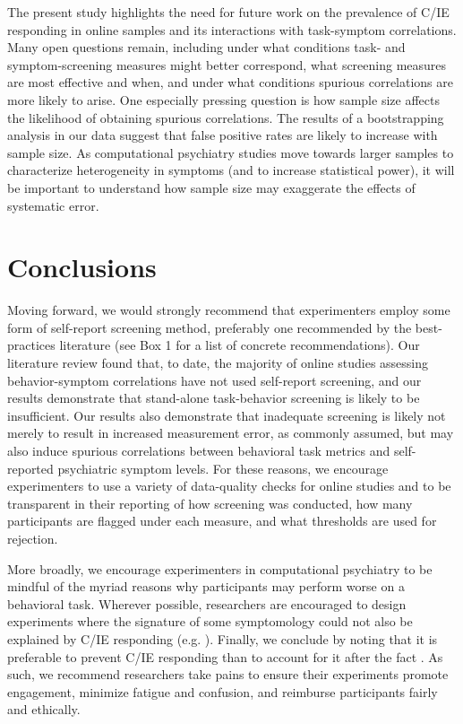 \documentclass[a4paper,notitlepage,12pt]{article}
\begin{document}
The present study highlights the need for future work on the prevalence of C/IE responding in online samples and its interactions with task-symptom correlations. Many open questions remain, including under what conditions task- and symptom-screening measures might better correspond, what screening measures are most effective and when, and under what conditions spurious correlations are more likely to arise. One especially pressing question is how sample size affects the likelihood of obtaining spurious correlations. The results of a bootstrapping analysis in our data suggest that false positive rates are likely to increase with sample size. As computational psychiatry studies move towards larger samples to characterize heterogeneity in symptoms (and to increase statistical power), it will be important to understand how sample size may exaggerate the effects of systematic error. 

\section{Conclusions}

Moving forward, we would strongly recommend that experimenters employ some form of self-report screening method, preferably one recommended by the best-practices literature (see Box 1 for a list of concrete recommendations). Our literature review found that, to date, the majority of online studies assessing behavior-symptom correlations have not used self-report screening, and our results demonstrate that stand-alone task-behavior screening is likely to be insufficient. Our results also demonstrate that inadequate screening is likely not merely to result in increased measurement error, as commonly assumed, but may also induce spurious correlations between behavioral task metrics and self-reported psychiatric symptom levels. For these reasons, we encourage experimenters to use a variety of data-quality checks for online studies and to be transparent in their reporting of how screening was conducted, how many participants are flagged under each measure, and what thresholds are used for rejection.

More broadly, we encourage experimenters in computational psychiatry to be mindful of the myriad reasons why participants may perform worse on a behavioral task. Wherever possible, researchers are encouraged to design experiments where the signature of some symptomology could not also be explained by C/IE responding (e.g. \cite{eldar2015interaction, hunter2019excessive}). Finally, we conclude by noting that it is preferable to prevent C/IE responding than to account for it after the fact \cite{ward2018applying}. As such, we recommend researchers take pains to ensure their experiments promote engagement, minimize fatigue and confusion, and reimburse participants fairly and ethically.
\end{document}
